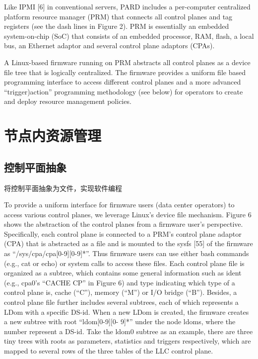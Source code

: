 Like IPMI [6] in conventional servers, PARD includes a
per-computer centralized platform resource manager (PRM) that
connects all control planes and tag registers (see the dash lines in
Figure 2). PRM is essentially an embedded system-on-chip (SoC)
that consists of an embedded processor, RAM, flash, a local bus, an
Ethernet adaptor and several control plane adaptors (CPAs).

A Linux-based firmware running on PRM abstracts all control
planes as a device file tree that is logically centralized. The
firmware provides a uniform file based programming interface to
access different control planes and a more advanced “trigger)action”
programming methodology (see below) for operators to create and
deploy resource management policies.


\section{节点内资源管理}

\subsection{控制平面抽象}

将控制平面抽象为文件，实现软件编程

To provide a uniform interface for firmware users (data center operators)
to access various control planes, we leverage Linux’s device
file mechanism. Figure 6 shows the abstraction of the control planes
from a firmware user’s perspective. Specifically, each control plane
is connected to a PRM’s control plane adaptor (CPA) that is abstracted
as a file and is mounted to the sysfs [55] of the firmware as
“/sys/cpa/cpa[0-9][0-9]*”. Thus firmware users can use either bash
commands (e.g., cat or echo) or system calls to access these files.
Each control plane file is organized as a subtree, which contains
some general information such as ident (e.g., cpa0’s “CACHE CP”
in Figure 6) and type indicating which type of a control plane
is, cache (“C”), memory (“M”) or I/O bridge (“B”). Besides, a
control plane file further includes several subtrees, each of which
represents a LDom with a specific DS-id. When a new LDom is
created, the firmware creates a new subtree with root “ldom[0-9][0-
9]*” under the node ldoms, where the number represent a DS-id.
Take the ldom0 subtree as an example, there are three tiny trees
with roots as parameters, statistics and triggers respectively, which
are mapped to several rows of the three tables of the LLC control
plane.

